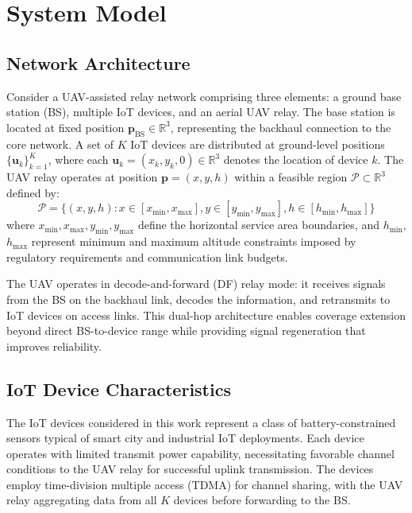 \documentclass[journal]{IEEEtran}
\begin{document}
\section{System Model}

\subsection{Network Architecture}

Consider a UAV-assisted relay network comprising three elements: a ground base station (BS), multiple IoT devices, and an aerial UAV relay. The base station is located at fixed position $\mathbf{p}_{\text{BS}} \in \mathbb{R}^3$, representing the backhaul connection to the core network. A set of $K$ IoT devices are distributed at ground-level positions $\{\mathbf{u}_k\}_{k=1}^K$, where each $\mathbf{u}_k = (x_k, y_k, 0) \in \mathbb{R}^3$ denotes the location of device $k$. The UAV relay operates at position $\mathbf{p} = (x, y, h)$ within a feasible region $\mathcal{P} \subset \mathbb{R}^3$ defined by:
\begin{equation}
\mathcal{P} = \{(x, y, h) : x \in [x_{\min}, x_{\max}], y \in [y_{\min}, y_{\max}], h \in [h_{\min}, h_{\max}]\}
\end{equation}
where $x_{\min}, x_{\max}, y_{\min}, y_{\max}$ define the horizontal service area boundaries, and $h_{\min}$, $h_{\max}$ represent minimum and maximum altitude constraints imposed by regulatory requirements and communication link budgets.

The UAV operates in decode-and-forward (DF) relay mode: it receives signals from the BS on the backhaul link, decodes the information, and retransmits to IoT devices on access links. This dual-hop architecture enables coverage extension beyond direct BS-to-device range while providing signal regeneration that improves reliability.

\subsection{IoT Device Characteristics}

The IoT devices considered in this work represent a class of battery-constrained sensors typical of smart city and industrial IoT deployments. Each device operates with limited transmit power capability, necessitating favorable channel conditions to the UAV relay for successful uplink transmission. The devices employ time-division multiple access (TDMA) for channel sharing, with the UAV relay aggregating data from all $K$ devices before forwarding to the BS.
\end{document}
